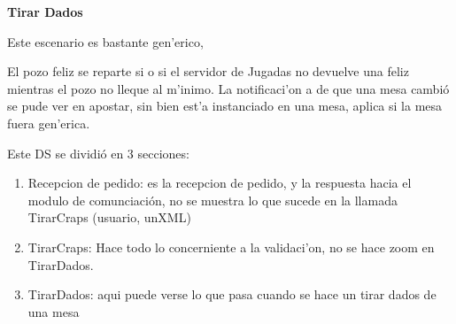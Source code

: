 



\textbf{Tirar Dados}


Este escenario es bastante gen'erico,


% 

El pozo feliz se reparte si o si el servidor de Jugadas no devuelve una feliz mientras el pozo no lleque al m'inimo.
La notificaci'on a de que una mesa cambió se pude ver en apostar, sin bien est'a instanciado en una mesa, aplica si la mesa fuera gen'erica.


Este DS se dividió en 3 secciones:
\begin{enumerate}
 \item Recepcion de pedido: es la recepcion de pedido,  y la respuesta hacia el modulo de comunciación, no se muestra lo que sucede en la llamada TirarCraps (usuario, unXML)
\item  TirarCraps: Hace todo lo concerniente a la validaci'on, no se hace zoom en TirarDados.
\item TirarDados: aqui puede verse lo que pasa cuando se hace un tirar dados de una mesa
\end{enumerate}